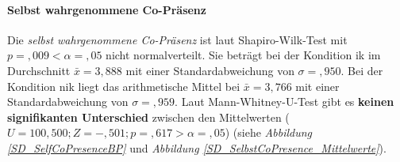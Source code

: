 \documentclass[a4paper,11pt]{article}%
\renewcommand{\\}{\vspace*{0.5\baselineskip} \newline}
\begin{document}
{\newpage

\paragraph{Selbst wahrgenommene Co-Präsenz}
Die \textit{selbst wahrgenommene Co-Präsenz} ist laut Shapiro-Wilk-Test mit $p =,009 < \alpha = ,05$ nicht normalverteilt.
Sie beträgt bei der Kondition \ac{ik} im Durchschnitt $\bar{x} = 3,888$ mit einer Standardabweichung von $\sigma =,950$.
Bei der Kondition \newline \ac{nik} liegt das arithmetische Mittel bei $\bar{x} = 3,766$ mit einer Standardabweichung von $\sigma =,959$. 
Laut Mann-Whitney-U-Test gibt es \textbf{keinen signifikanten Unterschied} zwischen den Mittelwerten ($U = 100,500; Z = -,501; p =,617 > \alpha = ,05$) (siehe \textit{Abbildung \ref{SD_SelfCoPresenceBP}} und \textit{Abbildung \ref{SD_SelbstCoPresence_Mittelwerte}}).
	
}
\end{document}
